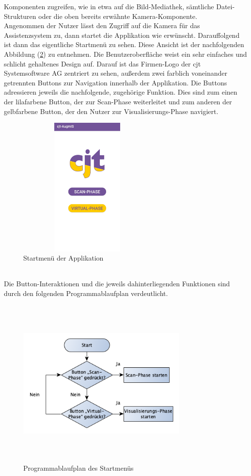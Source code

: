 Komponenten zugreifen, wie in etwa auf die Bild-Mediathek, sämtliche Datei-Strukturen oder die oben bereits erwähnte Kamera-Komponente.
\\ 
\linebreak
Angenommen der Nutzer lässt den Zugriff auf die Kamera für das Assistenzsystem zu, dann startet die Applikation wie erwünscht. Darauffolgend ist dann 
das eigentliche Startmenü zu sehen. Diese Ansicht ist der nachfolgenden Abbildung (\ref{pic:startmenu}) zu entnehmen. Die Benutzeroberfläche weist ein sehr einfaches und 
schlicht gehaltenes Design auf. 
Darauf ist das Firmen-Logo der cjt Systemsoftware AG zentriert zu sehen, außerdem zwei farblich voneinander getrennten Buttons zur Navigation innerhalb der Applikation. 
Die Buttons adressieren jeweils die nachfolgende, zugehörige Funktion. Dies sind zum einen der lilafarbene Button, der zur Scan-Phase weiterleitet und zum anderen der 
gelbfarbene Button, der den Nutzer zur Visualisierungs-Phase navigiert. %
\begin{figure}[hbt!]
    \centering
    \includegraphics[width=7cm,height=7cm,keepaspectratio]{4Umsetzung/Bilder/startmenu.jpg}
    \caption{Startmenü der Applikation}
    \label{pic:startmenu}
\end{figure}
\\
Die Button-Interaktionen und die jeweils dahinterliegenden Funktionen sind durch den folgenden Programmablaufplan verdeutlicht. 
\begin{figure}[hbt!]
    \centering
    \includegraphics[width=8.5cm,height=8.5cm,keepaspectratio]{4Umsetzung/Bilder/startPAP.png}
    \caption{Programmablaufplan des Startmenüs}
    \label{pic:startmenu}
\end{figure}
